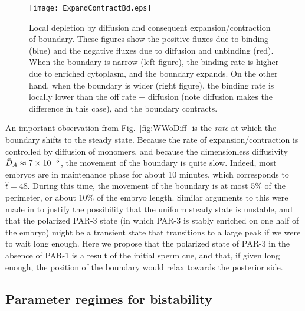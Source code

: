 \documentclass[11pt]{article}
\newcommand{\6}[1]{#1_{\text{6}}}
\newcommand{\3}[1]{#1_{\text{3}}}
\begin{document}
\begin{figure}
\centering
\texttt{[image: ExpandContractBd.eps]}
\caption{\label{fig:ExpContrBd}Local depletion by diffusion and consequent expansion/contraction of boundary. These figures show the positive fluxes due to binding (blue) and the negative fluxes due to diffusion and unbinding (red). When the boundary is narrow (left figure), the binding rate is higher due to enriched cytoplasm, and the boundary expands. On the other hand, when the boundary is wider (right figure), the binding rate is locally lower than the off rate + diffusion (note diffusion makes the difference in this case), and the boundary contracts. }
\end{figure}

An important observation from Fig.\ \ref{fig:WWoDiff} is the \emph{rate} at which the boundary shifts to the steady state. Because the rate of expansion/contraction is controlled by diffusion of monomers, and because the dimensionless diffusivity $\hat{D}_A \approx 7 \times 10^{-5}$,  the movement of the boundary is quite slow. Indeed, most embryos are in maintenance phase for about 10 minutes, which corresponds to $\hat t = 48$. During this time, the movement of the boundary is at most 5\% of the perimeter, or about 10\% of the embryo length. Similar arguments to this were made in \cite{lang2022oligomerization} to justify the possibility that the uniform steady state is unstable, and that the polarized PAR-3 state (in which PAR-3 is stably enriched on one half of the embryo) \cite{lang2023oligomerization} might be a transient state that transitions to a large peak if we were to wait long enough. Here we propose that the polarized state of PAR-3 in the absence of PAR-1 is a result of the initial sperm cue, and that, if given long enough, the position of the boundary would relax towards the posterior side.


\subsection{Parameter regimes for bistability}
\end{document}
